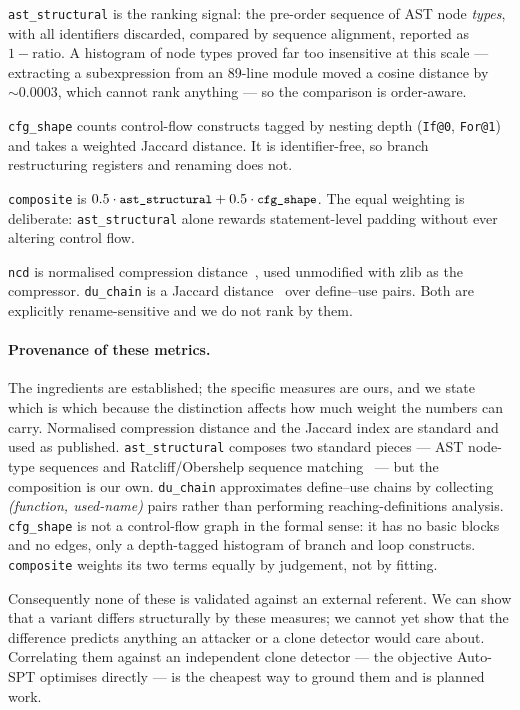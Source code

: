 \documentclass[10pt,twocolumn]{article}
\newcommand{\code}[1]{\texttt{\small #1}}
\begin{document}
\code{ast\_structural} is the ranking signal: the pre-order sequence of AST node
\emph{types}, with all identifiers discarded, compared by sequence alignment,
reported as $1 - \mathrm{ratio}$. A histogram of node types proved far too
insensitive at this scale --- extracting a subexpression from an 89-line module
moved a cosine distance by ${\sim}0.0003$, which cannot rank anything --- so the
comparison is order-aware.

\code{cfg\_shape} counts control-flow constructs tagged by nesting depth
(\code{If@0}, \code{For@1}) and takes a weighted Jaccard distance. It is
identifier-free, so branch restructuring registers and renaming does not.

\code{composite} is $0.5\cdot\code{ast\_structural} + 0.5\cdot\code{cfg\_shape}$.
The equal weighting is deliberate: \code{ast\_structural} alone rewards
statement-level padding without ever altering control flow.

\code{ncd} is normalised compression distance~\cite{ncd}, used unmodified with
zlib as the compressor. \code{du\_chain} is a Jaccard distance~\cite{jaccard}
over define--use pairs. Both are explicitly rename-sensitive and we do not rank
by them.

\paragraph{Provenance of these metrics.} The ingredients are established;
the specific measures are ours, and we state which is which because the
distinction affects how much weight the numbers can carry. Normalised
compression distance and the Jaccard index are standard and used as published.
\code{ast\_structural} composes two standard pieces --- AST node-type
sequences and Ratcliff/Obershelp sequence matching~\cite{ratcliff} --- but the
composition is our own. \code{du\_chain} approximates define--use chains by
collecting \emph{(function, used-name)} pairs rather than performing
reaching-definitions analysis. \code{cfg\_shape} is not a control-flow graph in
the formal sense: it has no basic blocks and no edges, only a depth-tagged
histogram of branch and loop constructs. \code{composite} weights its two terms
equally by judgement, not by fitting.

Consequently none of these is validated against an external referent. We can
show that a variant differs structurally by these measures; we cannot yet show
that the difference predicts anything an attacker or a clone detector would
care about. Correlating them against an independent clone detector --- the
objective Auto-SPT optimises directly --- is the cheapest way to ground them
and is planned work.
\end{document}
